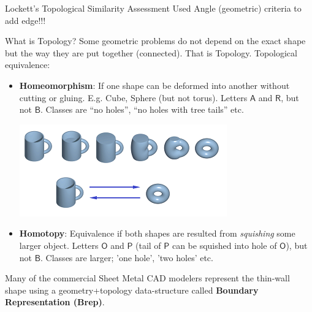 \begin{frame}{Lockett's Topological Similarity Assessment}
Used Angle (geometric) criteria to add edge!!!

\end{frame}

\begin{frame}{What is Topology?}
Some geometric problems do not depend on the exact shape but the way they are put together (connected). That is Topology.  Topological equivalence:
\begin{itemize}[noitemsep,label=\textbullet,topsep=2pt,parsep=2pt,partopsep=2pt]
\item \textbf{Homeomorphism}: If one shape can be deformed into another without cutting or gluing. E.g. Cube, Sphere (but not torus). Letters $\mathsf{A}$ and  $\mathsf{R}$, but not  $\mathsf{B}$. Classes are ``no holes'', ``no holes with tree tails'' etc.
\begin{center}
\includegraphics[width=0.2\linewidth]{../Common/images/TopologyHomeomorphism}
\end{center}

\item \textbf{Homotopy}: Equivalence if both shapes are resulted from {\em squishing} some larger object. Letters  $\mathsf{O}$ and  $\mathsf{P}$ (tail of  $\mathsf{P}$ can be squished into hole of  $\mathsf{O}$), but not  $\mathsf{B}$. Classes are larger; 'one hole', 'two holes' etc.
\end{itemize}

Many of the commercial Sheet Metal CAD modelers  represent the thin-wall shape using a geometry+topology data-structure called \textbf{Boundary Representation (Brep)}.


\end{frame}

